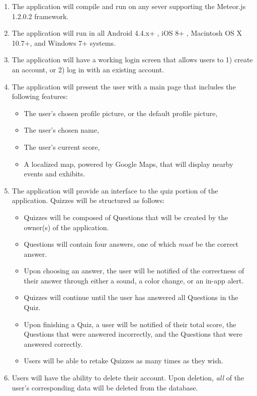 \documentclass{article}
\begin{document}
\begin{multicols}{2}
\begin{enumerate}
\item The application will compile and run on any sever supporting the Meteor.js 1.2.0.2 framework.
\item The application will run in all Android 4.4.x+ , iOS 8+ , Macintosh OS X 10.7+, and Windows 7+ systems.
\item The application will have a working login screen that allows users to 1) create an account, or 2) log in with an existing account.
\item The application will present the user with a main page that includes the following features:
\begin{itemize}
\item The user's chosen profile picture, or the default profile picture,
\item The user's chosen name,
\item The user's current score,
\item A localized map, powered by Google Maps, that will display nearby events and exhibits.
\end{itemize}
\item The application will provide an interface to the quiz portion of the application. Quizzes will be structured as follows:
\begin{itemize}
\item Quizzes will be composed of Questions that will be created by the owner(s) of the application.
\item Questions will contain four answers, one of which \textit{must} be the correct answer.
\item Upon choosing an answer, the user will be notified of the correctness of their answer through either a sound, a color change, or an in-app alert.
\item Quizzes will continue until the user has answered all Questions in the Quiz.
\item Upon finishing a Quiz, a user will be notified of their total score, the Questions that were answered incorrectly, and the Questions that were answered correctly.
\item Users will be able to retake Quizzes as many times as they wish.
\end{itemize}
\item Users will have the ability to delete their account. Upon deletion, \textit{all} of the user's corresponding data will be deleted from the database.

\end{enumerate}
\end{multicols}
\end{document}

